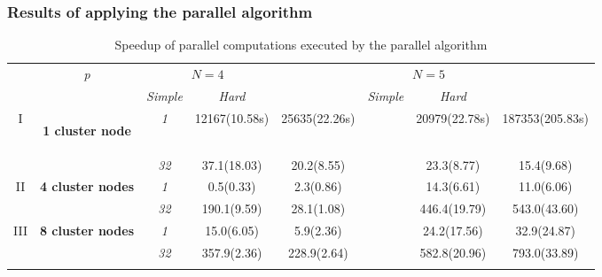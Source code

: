 \documentclass[aspectratio=1610]{beamer}
\begin{document}
\begin{frame}
  \frametitle{Results of applying the parallel algorithm}

  \begin{table}
    \centering
    \caption{Speedup of parallel computations executed by the parallel algorithm}
    \label{tab:speedup}
    \begin{tabular}{cccccccc}
      \cline{3-8}\noalign{\smallskip}
      \multicolumn{2}{c}{  } & \textit{p} & \multicolumn{2}{c}{$N=4$} & &
  \multicolumn{2}{c}{$N=5$}   \\
      \noalign{\smallskip} \cline{4-5} \cline{7-8}  \noalign{\smallskip}
      \multicolumn{2}{c}{  } & & \textit{Simple} & \textit{Hard} & & \textit{Simple} &
  \textit{Hard}  \\
      \noalign{\smallskip}\hline
      I &
      \parbox{0.25\textwidth}{
      \begin{center}
      \textbf{1 cluster node}
      \end{center}		}
      & \textit{1}   & 12167(10.58s) & 25635(22.26s) & & 20979(22.78s) & 187353(205.83s)  \\
    &  & \textit{32} & 37.1(18.03) & 20.2(8.55)  & &  23.3(8.77) & 15.4(9.68) \\
    \hline \noalign{\smallskip}
  II  & \textbf{4 cluster nodes}  %
  & \textit{1} &        0.5(0.33) & 2.3(0.86)  & & 14.3(6.61) & 11.0(6.06) \\
  &   & \textit{32} & 190.1(9.59) & 28.1(1.08) & & 446.4(19.79) & 543.0(43.60) \\
    \noalign{\smallskip}\hline	\noalign{\smallskip}
  III & \textbf{8 cluster nodes} %
  & \textit{1}    & 15.0(6.05)  & 5.9(2.36)   & & 24.2(17.56)  & 32.9(24.87)  \\
  & & \textit{32} & 357.9(2.36) & 228.9(2.64) & & 582.8(20.96) & 793.0(33.89) \\
      \noalign{\smallskip}\hline
    \end{tabular}
  \end{table}

\end{frame}
\end{document}
